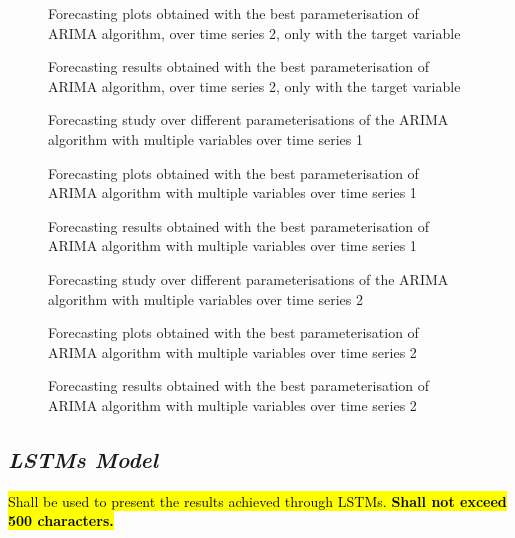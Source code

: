 \documentclass[10pt]{extarticle}
\newcommand{\ctext}[3][RGB]{%
  \begingroup
  \definecolor{hlcolor}{#1}{#2}\sethlcolor{hlcolor}%
  \hl{#3}%
  \endgroup
}
\begin{document}
\begin{figure}[H]
\caption{Forecasting plots obtained with the best parameterisation of ARIMA algorithm, over time series 2, only with the target variable}
\end{figure}

\begin{figure}[H]
\caption{Forecasting results obtained with the best parameterisation of ARIMA algorithm, over time series 2, only with the target variable}
\end{figure}

\begin{figure}[H]
\caption{Forecasting study over different parameterisations of the ARIMA algorithm with multiple variables over time series 1}
\end{figure}

\begin{figure}[H]
\caption{Forecasting plots obtained with the best parameterisation of ARIMA algorithm with multiple variables over time series 1}
\end{figure}

\begin{figure}[H]
\caption{Forecasting results obtained with the best parameterisation of ARIMA algorithm with multiple variables over time series 1}
\end{figure}

\begin{figure}[H]
\caption{Forecasting study over different parameterisations of the ARIMA algorithm with multiple variables over time series 2}
\end{figure}

\begin{figure}[H]
\caption{Forecasting plots obtained with the best parameterisation of ARIMA algorithm with multiple variables over time series 2}
\end{figure}

\begin{figure}[H]
\caption{Forecasting results obtained with the best parameterisation of ARIMA algorithm with multiple variables over time series 2}
\end{figure}

\subsection*{\textit{LSTMs Model}}
\ctext[RGB]{190,190,190}{Shall be used to present the results achieved through LSTMs.  \textbf{Shall not exceed 500 characters.}}
\end{document}
